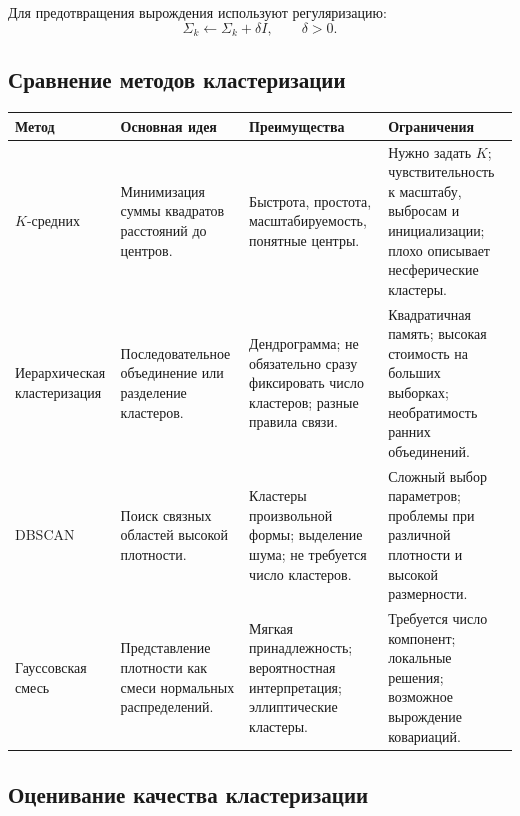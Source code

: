 \documentclass[12pt,a4paper]{article}
\theoremstyle{definition}
\theoremstyle{remark}
\begin{document}
Для предотвращения вырождения используют регуляризацию:
\[
    \Sigma_k
    \leftarrow
    \Sigma_k+\delta I,
    \qquad
    \delta>0.
\]

\subsection{Сравнение методов кластеризации}

\begin{table}[ht]
\centering
\small
\begin{tabularx}{\textwidth}{
    >{\raggedright\arraybackslash}p{2.6cm}
    >{\raggedright\arraybackslash}p{3.1cm}
    >{\raggedright\arraybackslash}X
    >{\raggedright\arraybackslash}X}
\toprule
\textbf{Метод} &
\textbf{Основная идея} &
\textbf{Преимущества} &
\textbf{Ограничения}\\
\midrule

$K$-средних &
Минимизация суммы квадратов расстояний до центров. &
Быстрота, простота, масштабируемость, понятные центры. &
Нужно задать $K$; чувствительность к масштабу, выбросам и инициализации;
плохо описывает несферические кластеры.\\

Иерархическая кластеризация &
Последовательное объединение или разделение кластеров. &
Дендрограмма; не обязательно сразу фиксировать число кластеров; разные
правила связи. &
Квадратичная память; высокая стоимость на больших выборках; необратимость
ранних объединений.\\

DBSCAN &
Поиск связных областей высокой плотности. &
Кластеры произвольной формы; выделение шума; не требуется число кластеров. &
Сложный выбор параметров; проблемы при различной плотности и высокой
размерности.\\

Гауссовская смесь &
Представление плотности как смеси нормальных распределений. &
Мягкая принадлежность; вероятностная интерпретация; эллиптические кластеры. &
Требуется число компонент; локальные решения; возможное вырождение
ковариаций.\\

\bottomrule
\end{tabularx}
\end{table}

\subsection{Оценивание качества кластеризации}
\end{document}
